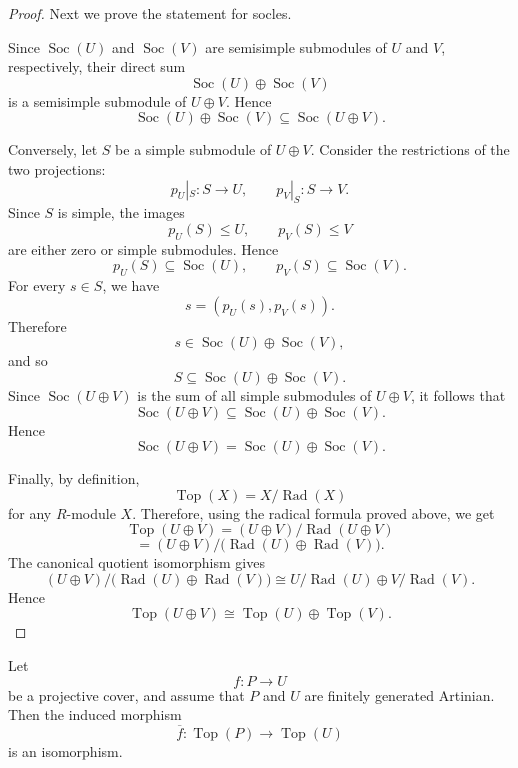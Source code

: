 \begin{proof}
    Next we prove the statement for socles.

    Since \(\operatorname{Soc}(U)\) and \(\operatorname{Soc}(V)\) are semisimple
    submodules of \(U\) and \(V\), respectively, their direct sum
    \[
        \operatorname{Soc}(U)\oplus \operatorname{Soc}(V)
    \]
    is a semisimple submodule of \(U\oplus V\). Hence
    \[
        \operatorname{Soc}(U)\oplus \operatorname{Soc}(V)
        \subseteq
        \operatorname{Soc}(U\oplus V).
    \]

    Conversely, let \(S\) be a simple submodule of \(U\oplus V\). Consider the restrictions
    of the two projections:
    \[
        p_U|_S:S\longrightarrow U,
        \qquad
        p_V|_S:S\longrightarrow V.
    \]
    Since \(S\) is simple, the images
    \[
        p_U(S)\leq U,
        \qquad
        p_V(S)\leq V
    \]
    are either zero or simple submodules. Hence
    \[
        p_U(S)\subseteq \operatorname{Soc}(U),
        \qquad
        p_V(S)\subseteq \operatorname{Soc}(V).
    \]
    For every \(s\in S\), we have
    \[
        s=(p_U(s),p_V(s)).
    \]
    Therefore
    \[
        s\in \operatorname{Soc}(U)\oplus \operatorname{Soc}(V),
    \]
    and so
    \[
        S\subseteq \operatorname{Soc}(U)\oplus \operatorname{Soc}(V).
    \]
    Since \(\operatorname{Soc}(U\oplus V)\) is the sum of all simple submodules of
    \(U\oplus V\), it follows that
    \[
        \operatorname{Soc}(U\oplus V)
        \subseteq
        \operatorname{Soc}(U)\oplus \operatorname{Soc}(V).
    \]
    Hence
    \[
        \operatorname{Soc}(U\oplus V)
        =
        \operatorname{Soc}(U)\oplus \operatorname{Soc}(V).
    \]

    Finally, by definition,
    \[
        \operatorname{Top}(X)=X/\operatorname{Rad}(X)
    \]
    for any \(R\)-module \(X\). Therefore, using the radical formula proved above, we get
    \[
        \operatorname{Top}(U\oplus V)
        =
        (U\oplus V)/\operatorname{Rad}(U\oplus V)
    \]
    \[
        =
        (U\oplus V)/
        \bigl(\operatorname{Rad}(U)\oplus \operatorname{Rad}(V)\bigr).
    \]
    The canonical quotient isomorphism gives
    \[
        (U\oplus V)/
        \bigl(\operatorname{Rad}(U)\oplus \operatorname{Rad}(V)\bigr)
        \cong
        U/\operatorname{Rad}(U)
        \oplus
        V/\operatorname{Rad}(V).
    \]
    Hence
    \[
        \operatorname{Top}(U\oplus V)
        \cong
        \operatorname{Top}(U)\oplus \operatorname{Top}(V).
    \]
\end{proof}

\begin{proposition}
    Let
    \[
        f:P\to U
    \]
    be a projective cover, and assume that $P$ and $U$ are finitely generated Artinian.
    Then the induced morphism
    \[
        \overline{f}:\operatorname{Top}(P)\to \operatorname{Top}(U)
    \]
    is an isomorphism.
\end{proposition}

